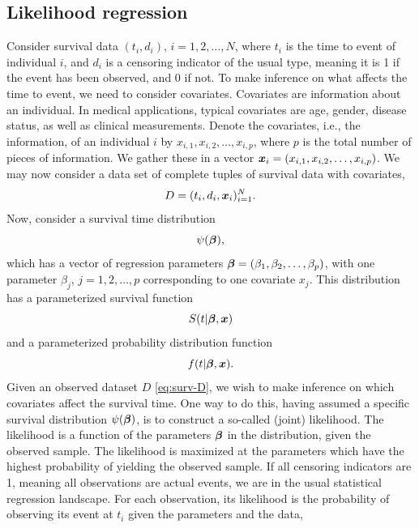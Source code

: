 \subsection{Likelihood regression}
Consider survival data $(t_i,d_i),\,i=1,2,\ldots,N$, where $t_i$ is the time to event of individual $i$, and $d_i$ is a censoring indicator of the usual type, meaning it is 1 if the event has been observed, and 0 if not.
To make inference on what affects the time to event, we need to consider covariates.
Covariates are information about an individual.
In medical applications, typical covariates are age, gender, disease status, as well as clinical measurements.
Denote the covariates, i.e., the information, of an individual $i$ by $x_{i,1},x_{i,2},\ldots,x_{i,p}$, where $p$ is the total number of pieces of information.
We gather these in a vector $\bm{x}_i=(x_{i,1},x_{i,2},\ldots,x_{i,p})$.
We may now consider a data set of complete tuples of survival data with covariates,
\begin{equation}\label{eq:surv-D}
    D=(t_i,d_i,\bm{x}_i)_{i=1}^N.
\end{equation}
Now, consider a survival time distribution
\begin{equation}\label{eq:surv-time-dist}
    \psi(\boldsymbol{\beta}),
\end{equation}
which has a vector of regression parameters $\boldsymbol{\beta}=(\beta_1,\beta_2,\ldots,\beta_p)$, with one parameter $\beta_j,\,j=1,2,\ldots,p$ corresponding to one covariate $x_j$.
This distribution has a parameterized survival function
\begin{equation*}
    S(t|\boldsymbol{\beta},\bm{x})
\end{equation*}
and a parameterized probability distribution function
\begin{equation*}
    f(t|\boldsymbol{\beta},\bm{x}).
\end{equation*}
Given an observed dataset $D$ \eqref{eq:surv-D}, we wish to make inference on which covariates affect the survival time.
One way to do this, having assumed a specific survival distribution $\psi(\boldsymbol{\beta})$, is to construct a so-called (joint) likelihood.
The likelihood is a function of the parameters $\boldsymbol{\beta}$ in the distribution, given the observed sample.
The likelihood is maximized at the parameters which have the highest probability of yielding the observed sample.
If all censoring indicators are 1, meaning all observations are actual events, we are in the usual statistical regression landscape.
For each observation, its likelihood is the probability of observing its event at $t_i$ given the parameters and the data,
